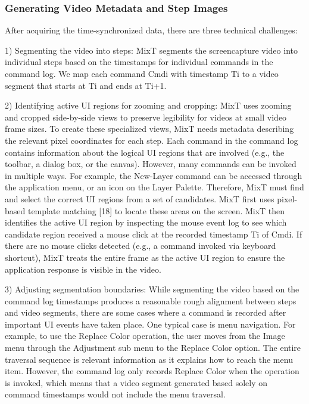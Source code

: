 \subsubsection{Generating Video Metadata and Step Images}
After acquiring the time-synchronized data, there are three technical challenges:

1) Segmenting the video into steps: MixT segments the screencapture video into individual steps based on the timestamps for individual commands in the command log. We map each command Cmdi with timestamp Ti to a video segment that starts at Ti and ends at Ti+1.

2) Identifying active UI regions for zooming and cropping: MixT uses zooming and cropped side-by-side views to preserve legibility for videos at small video frame sizes. To create these specialized views, MixT needs metadata describing the relevant pixel coordinates for each step. Each command in the command log contains information about the logical UI regions that are involved (e.g., the toolbar, a dialog box, or the canvas). However, many commands can be invoked in multiple ways. For example, the New-Layer command can be accessed through the application menu, or an icon on the Layer Palette. Therefore, MixT must find and select the correct UI regions from a set of candidates. MixT first uses pixel-based template matching [18] to locate these areas on the screen. MixT then identifies the active UI region by inspecting the mouse event log to see which candidate region received a mouse click at the recorded timestamp Ti of Cmdi. If there are no mouse clicks detected (e.g., a command invoked via keyboard shortcut), MixT treats the entire frame as the active UI region to ensure the application response is visible in the video.

3) Adjusting segmentation boundaries: While segmenting the video based on the command log timestamps produces a reasonable rough alignment between steps and video segments, there are some cases where a command is recorded after important UI events have taken place. One typical case is menu navigation. For example, to use the Replace Color operation, the user moves from the Image menu through the Adjustment sub menu to the Replace Color option. The entire traversal sequence is relevant information as it explains how to reach the menu item. However, the command log only records Replace Color when the operation is invoked, which means that a video segment generated based solely on command timestamps would not include the menu traversal.

